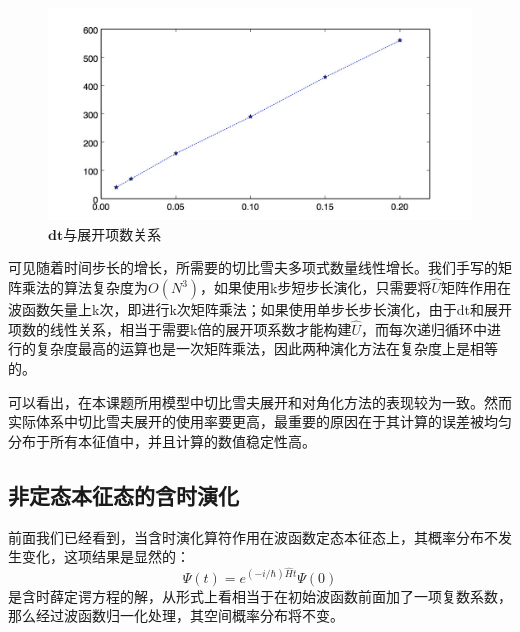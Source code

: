 \begin{figure}[hbt]
  \centering
  \captionsetup{justification=centering}
  \vspace{-1mm}
  \includegraphics[width=0.99\linewidth]{dt-M/dt-M}
  \caption{$\boldsymbol{dt}$与展开项数关系}
  \label{fig:dt-M}
\end{figure}

可见随着时间步长的增长，所需要的切比雪夫多项式数量线性增长。我们手写的矩阵乘法的算法复杂度为$O(N^3)$，如果使用k步短步长演化，只需要将$\hat{U}$矩阵作用在波函数矢量上k次，即进行k次矩阵乘法；如果使用单步长步长演化，由于dt和展开项数的线性关系，相当于需要k倍的展开项系数才能构建$\hat{U}$，而每次递归循环中进行的复杂度最高的运算也是一次矩阵乘法，因此两种演化方法在复杂度上是相等的。

可以看出，在本课题所用模型中切比雪夫展开和对角化方法的表现较为一致。然而实际体系中切比雪夫展开的使用率要更高，最重要的原因在于其计算的误差被均匀分布于所有本征值中，并且计算的数值稳定性高。

\subsection{非定态本征态的含时演化}
前面我们已经看到，当含时演化算符作用在波函数定态本征态上，其概率分布不发生变化，这项结果是显然的：
\begin{equation}
  \Psi(t) = e^{(-i/\hbar)\hat{H}t}\Psi(0)
\end{equation} 
是含时薛定谔方程的解，从形式上看相当于在初始波函数前面加了一项复数系数，那么经过波函数归一化处理，其空间概率分布将不变。

